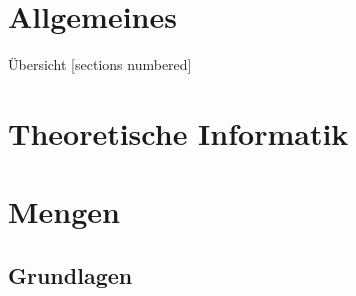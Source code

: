 %
%
%
%



\renewcommand\daynr{1}





\maketitle

\section{Allgemeines}



\begin{frame}[fragile]{Übersicht}
	[sections numbered]
	\tableofcontents%
\end{frame}

\section{Theoretische Informatik}



\section{Mengen}
\subsection{Grundlagen}

